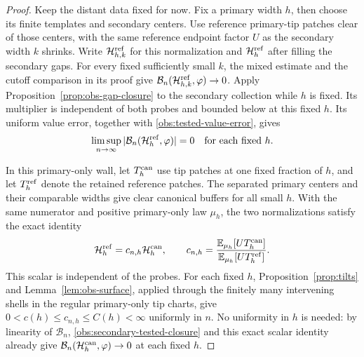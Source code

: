 \begin{proof}
Keep the distant data fixed for now.  Fix a primary width $h$,
then choose its finite templates and secondary centers.  Use
reference primary-tip patches clear of those centers, with the
same reference endpoint factor $U$ as the secondary width $k$
shrinks.  Write $\mathcal H_{h,k}^{\rm ref}$ for this normalization
and $\mathcal H_h^{\rm ref}$ after filling the secondary gaps.
For every fixed sufficiently small $k$, the mixed estimate and
the cutoff comparison in its proof give
$\mathcal B_n(\mathcal H_{h,k}^{\rm ref},\varphi)\to0$.
Apply Proposition~\ref{prop:obs-gap-closure} to the secondary
collection while $h$ is fixed.  Its multiplier is independent of
both probes and bounded below at this fixed $h$.  Its uniform
value error, together with \eqref{obs:tested-value-error}, gives
\begin{equation}
 \limsup_{n\to\infty}
 |\mathcal B_n(\mathcal H_h^{\rm ref},\varphi)|=0
 \quad\text{for each fixed }h.
 \label{obs:secondary-tested-closure}
\end{equation}

In this primary-only wall, let $T_h^{\rm can}$ use tip patches at
one fixed fraction of $h$, and let $T_h^{\rm ref}$ denote the
retained reference patches.  The separated primary centers and
their comparable widths give clear canonical buffers for all small
$h$.  With the same numerator and positive primary-only law $\mu_h$,
the two normalizations satisfy the exact identity
\begin{equation}
 \mathcal H_h^{\rm ref}=c_{n,h}\mathcal H_h^{\rm can},\qquad
 c_{n,h}=
 \frac{\mathbb E_{\mu_h}[UT_h^{\rm can}]}
      {\mathbb E_{\mu_h}[UT_h^{\rm ref}]}.
 \label{obs:primary-cutoff-change}
\end{equation}
This scalar is independent of the probes.  For each fixed $h$,
Proposition~\ref{prop:tilts} and Lemma~\ref{lem:obs-surface},
applied through the finitely many intervening shells in the regular
primary-only tip charts, give
$0<c(h)\le c_{n,h}\le C(h)<\infty$ uniformly in $n$.
No uniformity in $h$ is needed: by linearity of $\mathcal B_n$,
\eqref{obs:secondary-tested-closure} and this exact scalar identity
already give
$\mathcal B_n(\mathcal H_h^{\rm can},\varphi)\to0$ at each fixed $h$.


\end{proof}
